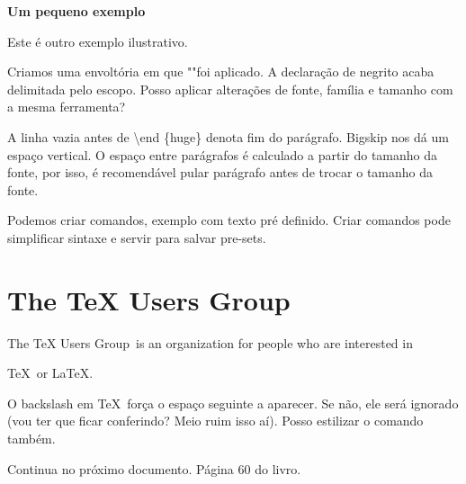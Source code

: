\documentclass[a4paper, 12pt]{article}
\begin{document}
\begin{huge}
    \bfseries
    Um pequeno exemplo

\end{huge}

\bigskip

Este é outro exemplo ilustrativo.


Criamos uma envoltória em que \huge "\normalsize "foi aplicado.
A declaração de negrito acaba delimitada pelo escopo.
Posso aplicar alterações de fonte, família e tamanho com a mesma ferramenta?

A linha vazia antes de \textbackslash end \{huge\} denota fim do parágrafo.
Bigskip nos dá um espaço vertical.
O espaço entre parágrafos é calculado a partir do tamanho 
da fonte, por isso, é recomendável pular parágrafo antes
de trocar o tamanho da fonte.

Podemos criar comandos, exemplo com texto pré definido.
Criar comandos pode simplificar sintaxe e servir para salvar
pre-sets.

\newcommand{\TUG}{TeX Users Group}

\section{The \TUG}

The \TUG\ is an organization for people who are interested in 

\TeX\ or \LaTeX.

\newcommand{\TUG}{\textsc{TeX Users Group}}

O backslash em \TeX\ força o espaço seguinte a aparecer.
Se não, ele será ignorado
(vou ter que ficar conferindo? Meio ruim isso aí).
Posso estilizar o comando também.

Continua no próximo documento. Página 60 do livro.
\end{document}
